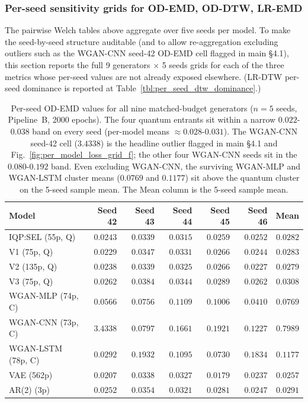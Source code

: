 \subsubsection{Per-seed sensitivity grids for OD-EMD, OD-DTW, LR-EMD}
\label{sec:per_seed_sensitivity}

The pairwise Welch tables above aggregate over five seeds per model.
To make the seed-by-seed structure auditable (and to allow
re-aggregation excluding outliers such as the WGAN-CNN
seed-42 OD-EMD cell flagged in main \S4.1), this section reports
the full 9 generators $\times$ 5 seeds grids for each of the three
metrics whose per-seed values are not already exposed elsewhere.
(LR-DTW per-seed dominance is reported at
Table~\ref{tbl:per_seed_dtw_dominance}.)

\begin{table}[!htbp]
\centering
\caption{Per-seed OD-EMD values for all nine matched-budget generators
($n=5$ seeds, Pipeline~B, 2000 epochs). The four quantum entrants
sit within a narrow $0.022$-$0.038$ band on every seed
(per-model means $\approx 0.028$-$0.031$). The WGAN-CNN seed-42
cell ($3.4338$) is the headline outlier flagged in main \S4.1 and
Fig.~\ref{fig:per_model_loss_grid_f}; the other four WGAN-CNN seeds
sit in the $0.080$-$0.192$ band. Even excluding WGAN-CNN, the
surviving WGAN-MLP and WGAN-LSTM cluster means ($0.0769$ and
$0.1177$) sit above the quantum cluster on the 5-seed sample mean.
The Mean column is the 5-seed sample mean.}
\label{tbl:per_seed_od_emd}
\scriptsize
\setlength{\tabcolsep}{6pt}
\begin{tabular}{@{}lrrrrrr@{}}
\toprule
\textbf{Model} & \textbf{Seed 42} & \textbf{Seed 43} & \textbf{Seed 44} & \textbf{Seed 45} & \textbf{Seed 46} & \textbf{Mean} \\
\midrule
IQP:SEL (55p, Q) & $0.0243$ & $0.0339$ & $0.0315$ & $0.0259$ & $0.0252$ & $0.0282$ \\
V1 (75p, Q) & $0.0229$ & $0.0347$ & $0.0331$ & $0.0266$ & $0.0244$ & $0.0283$ \\
V2 (135p, Q) & $0.0238$ & $0.0339$ & $0.0325$ & $0.0266$ & $0.0227$ & $0.0279$ \\
V3 (75p, Q) & $0.0262$ & $0.0384$ & $0.0344$ & $0.0289$ & $0.0262$ & $0.0308$ \\
WGAN-MLP (74p, C) & $0.0566$ & $0.0756$ & $0.1109$ & $0.1006$ & $0.0410$ & $0.0769$ \\
WGAN-CNN (73p, C) & $3.4338$ & $0.0797$ & $0.1661$ & $0.1921$ & $0.1227$ & $0.7989$ \\
WGAN-LSTM (78p, C) & $0.0292$ & $0.1932$ & $0.1095$ & $0.0730$ & $0.1834$ & $0.1177$ \\
VAE (562p) & $0.0207$ & $0.0338$ & $0.0327$ & $0.0179$ & $0.0237$ & $0.0257$ \\
AR(2) (3p) & $0.0252$ & $0.0354$ & $0.0321$ & $0.0281$ & $0.0247$ & $0.0291$ \\
\bottomrule
\end{tabular}
\end{table}

